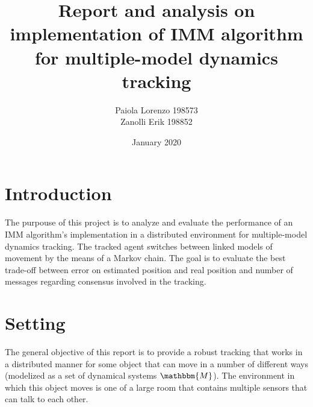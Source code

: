 \documentclass[twocolumn]{article}
\title{Report and analysis on implementation of IMM algorithm for multiple-model dynamics tracking}
\author{
Paiola Lorenzo 198573 

Zanolli Erik 198852}
\date{January 2020}
\begin{document}
\maketitle



\section*{Introduction}
\justify
The purpouse of this project is to analyze and evaluate the performance of an IMM algorithm's implementation in a distributed environment for
multiple-model dynamics tracking. The tracked agent switches between linked models of movement by the means of a Markov chain. The goal
is to evaluate the best trade-off between error on estimated position and real position and number of messages regarding consensus involved in the tracking.


\section*{Setting}
\justify
The general objective of this report is to provide a robust tracking that works in a distributed manner for some object that can move
in a number of different ways (modelized as a set of dynamical systems $\mathbbm{M}$). The environment in which this object moves is
one of a large room that contains multiple sensors that can talk to each other.
\\
\end{document}
